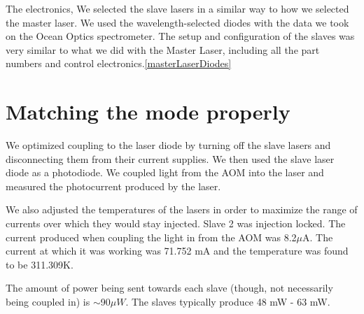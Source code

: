The electronics, We selected the slave lasers in a similar way to how we selected the master laser. We used the wavelength-selected diodes with the data we took on the Ocean Optics spectrometer. The setup and configuration of the slaves was very similar to what we did with the Master Laser, including all the part numbers and control electronics.\ref{masterLaserDiodes}



\section{Matching the mode properly}
We optimized coupling to the laser diode by turning off the slave lasers and disconnecting them from their current supplies. We then used the slave laser diode as a photodiode. We coupled light from the AOM into the laser and measured the photocurrent produced by the laser.

We also adjusted the temperatures of the lasers in order to maximize the range of currents over which they would stay injected. Slave 2 was injection locked. The current produced when coupling the light in from the AOM was 8.2$\mu$A. The current at which it was working was 71.752 mA %
and the temperature was found to be 311.309K. %

The amount of power being sent towards each slave (though, not necessarily being coupled in) is $\sim$90$\mu W$. The slaves typically produce 48 mW - 63 mW.



